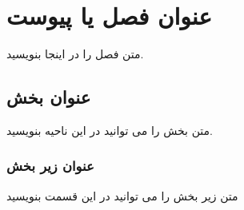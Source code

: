 \chapter{عنوان فصل یا پیوست}
متن فصل را در اینجا بنویسید.

\section{عنوان بخش }
متن بخش را می توانید در این ناحیه بنویسید.

\subsection{عنوان زیر بخش }
متن زیر بخش را می توانید در این قسمت بنویسید